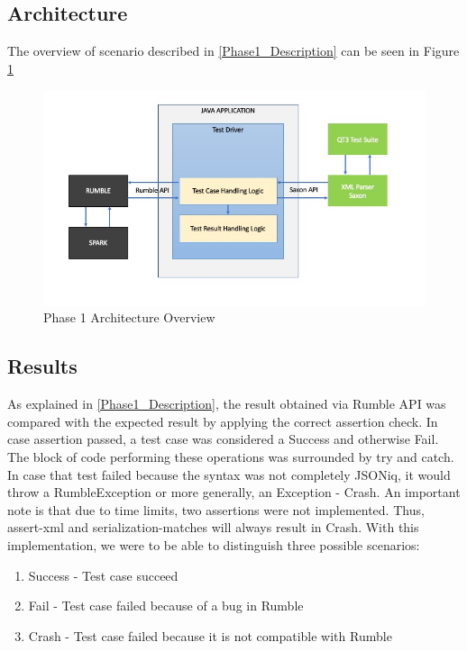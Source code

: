 \subsection{Architecture}
The overview of scenario described in \ref{Phase1_Description} can be seen in Figure \ref{fig:Phase1_Architecture}
 \begin{figure}[h!]
 	\vspace*{-5mm}
 	\includegraphics[width=\linewidth]{architecture_diagram_phase_1.jpeg}
 	\vspace*{-15mm}
 	\caption{Phase 1 Architecture Overview}
 	\label{fig:Phase1_Architecture}
 \end{figure}

\vspace*{-5mm}
\subsection{Results}

\label{Phase1_Results}
As explained in \ref{Phase1_Description}, the result obtained via Rumble API was compared with the expected result by applying the correct assertion check. In case assertion passed, a test case was considered a Success and otherwise Fail. The block of code performing these operations was surrounded by try and catch. In case that test failed because the syntax was not completely JSONiq, it would throw a RumbleException or more generally, an Exception - Crash. An important note is that due to time limits, two assertions were not implemented. Thus, assert-xml and serialization-matches will always result in Crash. With this implementation, we were to be able to distinguish three possible scenarios:

\begin{enumerate}
	\item Success - Test case succeed
	\item Fail - Test case failed because of a bug in Rumble
	\item Crash - Test case failed because it is not compatible with Rumble
\end{enumerate}

